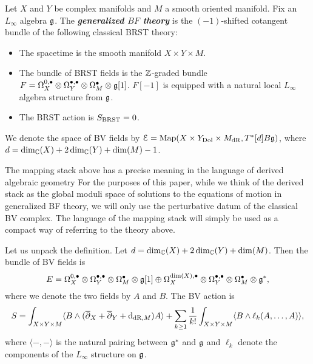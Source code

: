 \documentclass[10pt, oneside]{article}
\newcommand{\defterm}[1]{\textbf{\emph{#1}}}
\begin{document}
\begin{definition}
Let $X$ and $Y$ be complex manifolds and $M$ a smooth oriented manifold. Fix an $L_\infty$ algebra $\mathfrak g$. The \defterm{generalized $BF$ theory} is the $(-1)$-shifted cotangent bundle of the following classical BRST theory:
\begin{itemize}
\item The spacetime is the smooth manifold $X\times Y\times M$.

\item The bundle of BRST fields is the $\mathbb Z$-graded bundle $F = \Omega^{0,\bullet}_X \otimes \Omega^{\bullet,\bullet}_Y \otimes \Omega^\bullet_M \otimes \mathfrak g[1]$. $F[-1]$ is equipped with a natural local $L_\infty$ algebra structure from $\mathfrak g$.

\item The BRST action is $S_{\mathrm{BRST}} = 0$.
\end{itemize}
We denote the space of BV fields by $\mathcal E = \operatorname{Map}(X\times Y_{\mathrm{Dol}}\times M_{\mathrm{dR}}, T^*[d] B\mathfrak g)$, where $d = \dim_\mathbb C(X) + 2\dim_\mathbb C(Y) + \dim(M) - 1$.
\label{def:generalizedBF}
\end{definition}

\begin{remark} \label{mapping_stack_remark}
The mapping stack above has a precise meaning in the language of derived algebraic geometry   For the purposes of this paper, while we think of the derived stack as the global moduli space of solutions to the equations of motion in generalized BF theory, we will only use the perturbative datum of the classical BV complex.  The language of the mapping stack will simply be used as a compact way of referring to the theory above. 
\end{remark}

Let us unpack the definition. Let $d = \dim_\mathbb C(X) + 2\dim_\mathbb C(Y) + \dim(M)$. Then the bundle of BV fields is
\[E = \Omega^{0,\bullet}_X \otimes \Omega^{\bullet,\bullet}_Y \otimes \Omega^\bullet_M \otimes \mathfrak g[1]\oplus \Omega^{\dim(X),\bullet}_X \otimes \Omega^{\bullet,\bullet}_Y \otimes \Omega^\bullet_M\otimes \mathfrak g^*,\]
 where we denote the two fields by $A$ and $B$. The BV action is
\[S = \int_{X\times Y\times M} \langle B\wedge (\overline{\partial}_X + \overline{\partial}_Y + {\rm d}_{\mathrm{dR}, M}) A\rangle + \sum_{k\geq 1}\frac{1}{k!} \int_{X\times Y\times M} \langle B\wedge \ell_k(A, \dots, A)\rangle,\]
where $\langle -, -\rangle$ is the natural pairing between $\mathfrak g^*$ and $\mathfrak g$ and $\ell_k$ denote the components of the $L_\infty$ structure on $\mathfrak g$.
\end{document}
